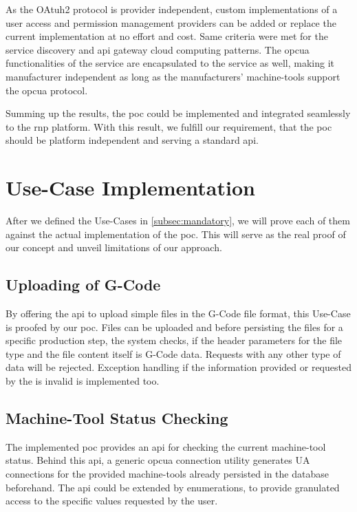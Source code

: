 \documentclass[
a4paper,
twoside,
headsepline,
cleardoublepage=empty,
parskip=half,
draft=false
]{scrbook}
\begin{document}
			As the OAtuh2 protocol is provider independent, custom implementations of a user access and permission management providers can be added or replace the current implementation at no effort and cost. Same criteria were met for the service discovery and \gls{api} gateway cloud computing patterns.
			The \gls{opcua} functionalities of the service are encapsulated to the service as well, making it manufacturer independent as long as the manufacturers' machine-tools support the \gls{opcua} protocol.

			Summing up the results, the \gls{poc} could be implemented and integrated seamlessly to the \gls{rnp} platform. With this result, we fulfill our requirement, that the \gls{poc} should be platform independent and serving a standard \gls{api}.

	\newpage

		\section{Use-Case Implementation}\label{sec:use_cases_implementation}

			After we defined the Use-Cases in \cref{subsec:mandatory}, we will prove each of them against the actual implementation of the \gls{poc}. This will serve as the real proof of our concept and unveil limitations of our approach.

			\subsection{Uploading of G-Code}\label{subsec:uploading_g_code}

				By offering the \gls{api} to upload simple files in the G-Code file format, this Use-Case is proofed by our \gls{poc}. Files can be uploaded and before persisting the files for a specific production step, the system checks, if the header parameters for the file type and the file content itself is G-Code data. Requests with any other type of data will be rejected. Exception handling if the information provided or requested by the is invalid is implemented too.

			\subsection{Machine-Tool Status Checking}\label{subsec:machine_tool_status_checking}

				The implemented \gls{poc} provides an \gls{api} for checking the current machine-tool status. Behind this \gls{api}, a generic \gls{opcua} connection utility generates UA connections for the provided machine-tools already persisted in the database beforehand. The \gls{api} could be extended by enumerations, to provide granulated access to the specific values requested by the user.
\end{document}
